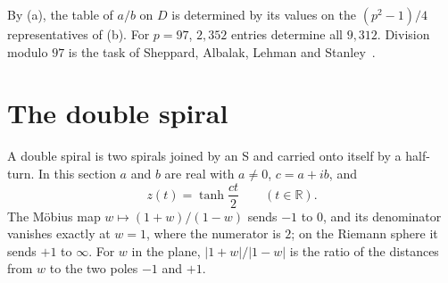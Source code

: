 \documentclass[11pt,a4paper]{article}
\theoremstyle{definition}
\newcommand{\R}{\mathbb R}
\begin{document}
By (a), the table of $a/b$ on $D$ is determined by its values on the $(p^2-1)/4$ representatives of (b). For $p=97$, $2{,}352$ entries determine all $9{,}312$. Division modulo $97$ is the task of Sheppard, Albalak, Lehman and Stanley~\cite{ufo}.

\section{The double spiral}
A double spiral is two spirals joined by an S and carried onto itself by a half-turn. In this section $a$ and $b$ are real with $a\ne0$, $c=a+ib$, and
\[
z(t)=\tanh\frac{ct}2\qquad(t\in\R).
\]
The Möbius map $w\mapsto(1+w)/(1-w)$ sends $-1$ to $0$, and its denominator vanishes exactly at $w=1$, where the numerator is $2$; on the Riemann sphere it sends $+1$ to $\infty$. For $w$ in the plane, $|1+w|/|1-w|$ is the ratio of the distances from $w$ to the two poles $-1$ and $+1$.
\end{document}
